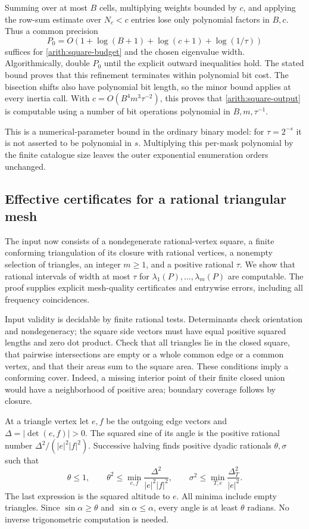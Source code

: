 \documentclass[11pt,reqno]{amsart}
\numberwithin{equation}{section}
\begin{document}
Summing over at most $B$ cells, multiplying weights bounded
by $c$, and applying the row-sum estimate over $N_c<c$ entries
lose only polynomial factors in $B,c$.  Thus a common precision
\begin{equation}\label{arith:entry-precision}
 P_0=O\left(1+\log(B+1)+\log(c+1)+\log(1/\tau)\right)
\end{equation}
suffices for \eqref{arith:square-budget} and the chosen
eigenvalue width.  Algorithmically, double $P_0$ until the
explicit outward inequalities hold.  The stated bound proves
that this refinement terminates within polynomial bit cost.
The bisection shifts also have polynomial bit length, so the
minor bound applies at every inertia call.  With
$c=O(B^4m^3\tau^{-2})$, this proves that
\eqref{arith:square-output} is computable using a number of
bit operations polynomial in $B,m,\tau^{-1}$.

This is a numerical-parameter bound in the ordinary binary
model: for $\tau=2^{-s}$ it is not asserted to be polynomial
in $s$.  Multiplying this per-mask polynomial by the finite
catalogue size leaves the outer exponential enumeration orders
unchanged.

\subsection{Effective certificates for a rational triangular mesh}
\label{arith:triangles}

The input now consists of a nondegenerate rational-vertex
square, a finite conforming triangulation of its closure with
rational vertices, a nonempty selection of triangles, an
integer $m\ge1$, and a positive rational $\tau$.
We show that rational intervals of width at most $\tau$ for
$\lambda_1(P),\ldots,\lambda_m(P)$ are computable.
The proof supplies explicit mesh-quality certificates and
entrywise errors, including all frequency coincidences.

Input validity is decidable by finite rational tests.
Determinants check orientation and nondegeneracy; the square
side vectors must have equal positive squared lengths and
zero dot product.  Check that all triangles lie in the closed
square, that pairwise intersections are empty or a whole common
edge or a common vertex, and that their areas sum to the square
area.  These conditions imply a conforming cover.  Indeed, a
missing interior point of their finite closed union would
have a neighborhood of positive area; boundary coverage follows
by closure.

At a triangle vertex let $e,f$ be the outgoing edge vectors
and $\Delta=|\det(e,f)|>0$.  The squared sine of its angle is
the positive rational number $\Delta^2/(|e|^2|f|^2)$.
Successive halving finds positive dyadic rationals $\theta,\sigma$
such that
\begin{equation}\label{arith:quality}
 \theta\le1,\qquad
 \theta^2\le\min_{e,f}\frac{\Delta^2}{|e|^2|f|^2},\qquad
 \sigma^2\le\min_{T,e}\frac{\Delta_T^2}{|e|^2}.
\end{equation}
The last expression is the squared altitude to $e$.
All minima include empty triangles.  Since
$\sin\alpha\ge\theta$ and $\sin\alpha\le\alpha$, every angle
is at least $\theta$ radians.  No inverse trigonometric
computation is needed.
\end{document}
